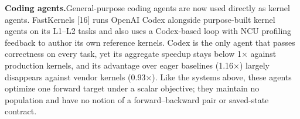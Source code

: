 \noindent\textbf{Coding agents.}General-purpose coding agents are now used directly as kernel agents. FastKernels [16] runs OpenAI Codex alongside purpose-built kernel agents on its L1–L2 tasks and also uses a Codex-based loop with NCU profiling feedback to author its own reference kernels. Codex is the only agent that passes correctness on every task, yet its aggregate speedup stays below 1× against production kernels, and its advantage over eager baselines (1.16×) largely disappears against vendor kernels (0.93×). Like the systems above, these agents optimize one forward target under a scalar objective; they maintain no population and have no notion of a forward–backward pair or saved-state contract. 

